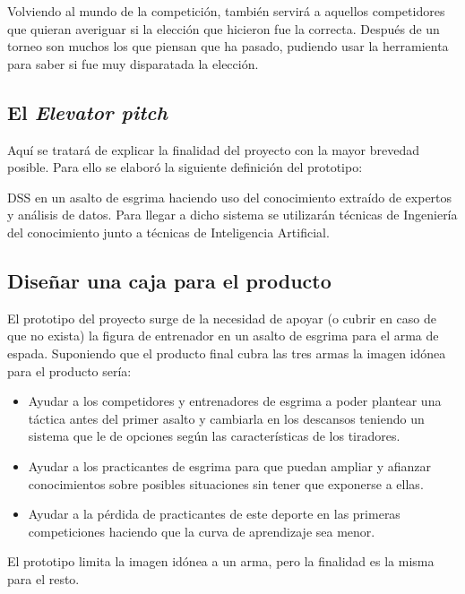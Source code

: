 Volviendo al mundo de la competición, también servirá a aquellos competidores que quieran
averiguar si la elección que hicieron fue la correcta. Después de un torneo son muchos
los que piensan que ha pasado, pudiendo usar la herramienta para saber si fue muy
disparatada la elección.

\subsection{El \textit{Elevator pitch}}
Aquí se tratará de explicar la finalidad del proyecto con la mayor brevedad posible. Para ello
se elaboró la siguiente definición del prototipo:

\acs{DSS} en un asalto de esgrima haciendo uso del
conocimiento extraído de expertos y análisis de datos. Para llegar a dicho sistema
se utilizarán técnicas de Ingeniería del conocimiento junto a técnicas de Inteligencia
Artificial.

\subsection{Diseñar una caja para el producto}
El prototipo del proyecto surge de la necesidad de apoyar (o cubrir en caso de que no exista)
la figura de entrenador en un asalto de esgrima para el arma de espada. Suponiendo que el
producto final cubra las tres armas la imagen idónea para el producto sería:

\begin{itemize}
  \item Ayudar a los competidores y entrenadores de esgrima a poder plantear una táctica antes
    del primer asalto y cambiarla en los descansos teniendo un sistema
    que le de opciones según las características de los tiradores.
  \item Ayudar a los practicantes de esgrima para que puedan ampliar y afianzar conocimientos
    sobre posibles situaciones sin tener que exponerse a ellas.
  \item Ayudar a la pérdida de practicantes de este deporte en las primeras competiciones haciendo
    que la curva de aprendizaje sea menor.
\end{itemize}

El prototipo limita la imagen idónea a un arma, pero la finalidad es la misma para el resto.
